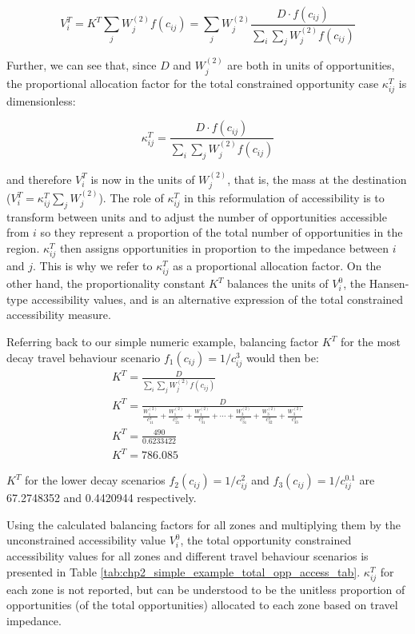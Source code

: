 \documentclass[
11pt, %
oneside, %
english, %
singlespacing, %
]{macthesis} %
\begin{document}
\[
V^T_i = K^T\sum_j W^{(2)}_jf(c_{ij}) = \sum_j W^{(2)}_j\frac{D\cdot f(c_{ij})}{\sum_i\sum_j W^{(2)}_jf(c_{ij})}
\]

Further, we can see that, since \(D\) and \(W^{(2)}_j\) are both in units of opportunities, the proportional allocation factor for the total constrained opportunity case \(\kappa_{ij}^T\) is dimensionless:

\[
\kappa_{ij}^T = \frac{D\cdot f(c_{ij})}{\sum_i\sum_j W^{(2)}_jf(c_{ij})}
\]

\noindent and therefore \(V^T_i\) is now in the units of \(W^{(2)}_j\), that is, the mass at the destination (\(V^T_i = \kappa_{ij}^T\sum_j W^{(2)}_j\)). The role of \(\kappa_{ij}^T\) in this reformulation of accessibility is to transform between units and to adjust the number of opportunities accessible from \(i\) so they represent a proportion of the total number of opportunities in the region. \(\kappa_{ij}^T\) then assigns opportunities in proportion to the impedance between \(i\) and \(j\). This is why we refer to \(\kappa_{ij}^T\) as a proportional allocation factor. On the other hand, the proportionality constant \(K^T\) balances the units of \(V^0_i\), the Hansen-type accessibility values, and is an alternative expression of the total constrained accessibility measure.

Referring back to our simple numeric example, balancing factor \(K^T\) for the most decay travel behaviour scenario \(f_1(c_{ij}) = 1/c_{ij}^3\) would then be:
\[
\begin{array}{l}
K^T = \frac{D}{\sum_{i}\sum_{j} W_j^{(2)} f(c_{ij})}\\
K^T = \frac{D}{\frac{W_1^{(2)}}{c_{11}^3}+\frac{W_1^{(2)}}{c_{21}^3} + \frac{W_1^{(2)}}{c_{31}^3} + \cdots + \frac{W_3^{(2)}}{c_{31}^3} + \frac{W_3^{(2)}}{c_{32}^3} + \frac{W_3^{(2)}}{c_{33}^3}
}\\
K^T = \frac{490}{0.6233422} \\
K^T = 786.085
\end{array}
\]

\(K^T\) for the lower decay scenarios \(f_2(c_{ij}) = 1/c_{ij}^2\) and \(f_3(c_{ij}) = 1/c_{ij}^{0.1}\) are 67.2748352 and 0.4420944 respectively.

Using the calculated balancing factors for all zones and multiplying them by the unconstrained accessibility value \(V^0_i\), the total opportunity constrained accessibility values for all zones and different travel behaviour scenarios is presented in Table \ref{tab:chp2_simple_example_total_opp_access_tab}. \(\kappa_{ij}^T\) for each zone is not reported, but can be understood to be the unitless proportion of opportunities (of the total opportunities) allocated to each zone based on travel impedance.
\end{document}
